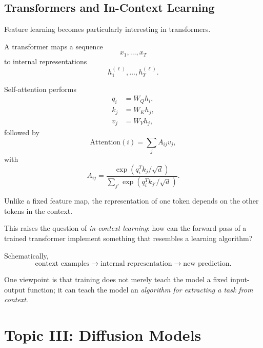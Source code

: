 \subsection{Transformers and In-Context Learning}

Feature learning becomes particularly interesting in transformers.

A transformer maps a sequence
\begin{equation}
    x_1,\ldots,x_T
\end{equation}
to internal representations
\begin{equation}
    h_1^{(\ell)},\ldots,h_T^{(\ell)}.
\end{equation}

Self-attention performs
\begin{align}
    q_i &= W_Q h_i,\\
    k_j &= W_K h_j,\\
    v_j &= W_V h_j,
\end{align}
followed by
\begin{equation}
    \mathrm{Attention}(i)
    =
    \sum_j
    A_{ij}v_j,
\end{equation}
with
\begin{equation}
    A_{ij}
    =
    \frac{
        \exp(q_i^Tk_j/\sqrt d)
    }{
        \sum_{j'}
        \exp(q_i^Tk_{j'}/\sqrt d)
    }.
\end{equation}

Unlike a fixed feature map, the representation of one token depends on the
other tokens in the context.

This raises the question of \emph{in-context learning}: how can the forward
pass of a trained transformer implement something that resembles a learning
algorithm?

Schematically,
\begin{equation}
    \text{context examples}
    \rightarrow
    \text{internal representation}
    \rightarrow
    \text{new prediction}.
\end{equation}

One viewpoint is that training does not merely teach the model a fixed
input-output function; it can teach the model an \emph{algorithm for extracting
a task from context}.


\section{Topic III: Diffusion Models}

